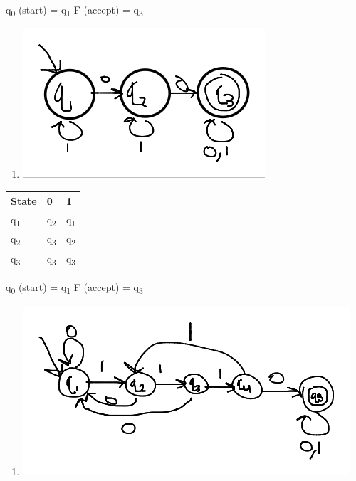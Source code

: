 \documentclass[11pt]{article}
\begin{document}
q\textsubscript{0} (start) = q\textsubscript{1}
F (accept) = q\textsubscript{3}
\begin{enumerate}
\item \begin{center}
\includegraphics[width=.9\linewidth]{1-2.png}
\end{center}
\end{enumerate}
\begin{center}
\begin{tabular}{l|l|l}
State & 0 & 1\\
\hline
q\textsubscript{1} & q\textsubscript{2} & q\textsubscript{1}\\
q\textsubscript{2} & q\textsubscript{3} & q\textsubscript{2}\\
q\textsubscript{3} & q\textsubscript{3} & q\textsubscript{3}\\
\end{tabular}
\end{center}
q\textsubscript{0} (start) = q\textsubscript{1}
F (accept) = q\textsubscript{3}
\begin{enumerate}
\item \begin{center}
\includegraphics[width=.9\linewidth]{1-3.png}
\end{center}
\end{enumerate}
\end{document}
